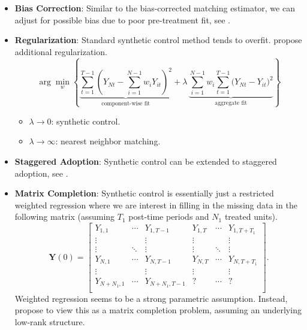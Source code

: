 \documentclass[11pt]{exam}
\begin{document}
\begin{itemize}
    \item \textbf{Bias Correction}: Similar to the bias-corrected matching estimator, we can adjust for possible bias due to poor pre-treatment fit, see \cite{ben2021augmented}.
    \item \textbf{Regularization}: Standard synthetic control method tends to overfit. \citet{abadie2021penalized} propose additional regularization.
 \[
    \arg\min_{w}
    \left\{
      \underbrace{
        \sum_{t=1}^{T-1}
        \left(
          Y_{Nt} - \sum_{i=1}^{N-1} w_i Y_{it}
        \right)^2
      }_{\text{component-wise fit}}
      +
      \lambda\,
      \underbrace{
        \sum_{i=1}^{N-1} w_i
        \sum_{t=1}^{T-1}
        \bigl(Y_{Nt} - Y_{it}\bigr)^2
      }_{\text{aggregate fit}}
    \right\}
  \]
    \begin{itemize}
    \item $\lambda \to 0$: synthetic control.
    \item $\lambda \to \infty$: nearest neighbor matching.
  \end{itemize}
  \item \textbf{Staggered Adoption}: Synthetic control can be extended to staggered adoption, see \citet{ben2022synthetic}.
    \item \textbf{Matrix Completion}: Synthetic control is essentially just a restricted weighted regression where we are interest in filling in the missing data in the following matrix (assuming $T_1$ post-time periods and $N_1$ treated units).
    \[
\mathbf Y(0)
=
\left[
\begin{array}{ccc|ccc}
Y_{1,1}   & \cdots & Y_{1,T-1}   & Y_{1,T}   & \cdots & Y_{1,T+T_1} \\
\vdots    &        & \vdots      & \vdots    &        & \vdots    \\
\vdots    & \ddots & \vdots      & \vdots    & \ddots & \vdots    \\
Y_{N,1}   & \cdots & Y_{N,T-1}   & Y_{N,T}   & \cdots & Y_{N,T+T_1} \\
\vdots    &        & \vdots      & \vdots    &        & \vdots    \\
Y_{N+N_1,1} & \cdots & Y_{N+N_1,T-1} & ?      & \cdots & ?         \\
\end{array}
\right].
\]
    Weighted regression seems to be a strong parametric assumption. Instead, \citet{athey2021matrix} propose to view this as a matrix completion problem, assuming an underlying low-rank structure.
\end{itemize}
\end{document}
